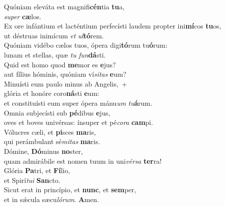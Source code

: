 \evenverse Quóniam eleváta est magnifi\textbf{cén}tia \textbf{tu}a,~\*\\
\evenverse \textit{su}\textit{per} \textbf{cæ}los.\\
\oddverse Ex ore infántium et lacténtium perfecísti laudem propter ini\textbf{mí}cos \textbf{tu}os,~\*\\
\oddverse ut déstruas inimícum \textit{et} \textit{ul}\textbf{tó}rem.\\
\evenverse Quóniam vidébo cælos tuos, ópera digi\textbf{tó}rum tu\textbf{ó}rum:~\*\\
\evenverse lunam et stellas, quæ \textit{tu} \textit{fun}\textbf{dá}sti.\\
\oddverse Quid est homo quod \textbf{me}mor es \textbf{e}jus?~\*\\
\oddverse aut fílius hóminis, quóniam ví\textit{si}\textit{tas} \textbf{e}um?\\
\evenverse Minuísti eum paulo minus ab Angelis,~+\\
\evenverse  glória et honóre coro\textbf{ná}sti \textbf{e}um:~\*\\
\evenverse et constituísti eum super ópera mánu\textit{um} \textit{tu}\textbf{á}rum.\\
\oddverse Omnia subjecísti sub \textbf{pé}dibus \textbf{e}jus,~\*\\
\oddverse oves et boves univérsas: ínsuper et pé\textit{co}\textit{ra} \textbf{cam}pi.\\
\evenverse Vólucres cæli, et \textbf{pi}sces \textbf{ma}ris,~\*\\
\evenverse qui perámbulant sé\textit{mi}\textit{tas} \textbf{ma}ris.\\
\oddverse Dómine, \textbf{Dó}minus \textbf{no}ster,~\*\\
\oddverse quam admirábile est nomen tuum in uni\textit{vér}\textit{sa} \textbf{ter}ra!\\
\evenverse Glória \textbf{Pa}tri, et \textbf{Fí}lio,~\*\\
\evenverse et Spirí\textit{tu}\textit{i} \textbf{San}cto.\\
\oddverse Sicut erat in princípio, et \textbf{nunc}, et \textbf{sem}per,~\*\\
\oddverse et in sǽcula sæcu\textit{ló}\textit{rum}. \textbf{A}men.\\
